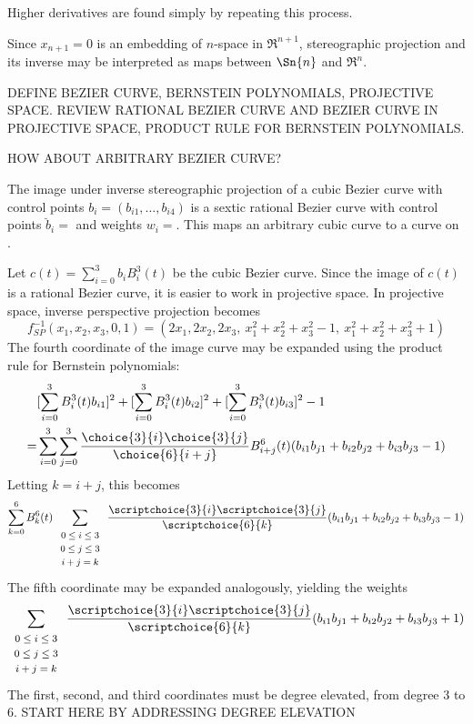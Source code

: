 \documentclass[12pt]{article}
\begin{document}
Higher derivatives are found simply by repeating this process.

Since $x_{n+1}=0$ is an embedding of $n$-space in $\Re^{n+1}$,
stereographic projection and its inverse may be interpreted as maps between 
$\Sn{n}$ and $\Re^n$.

DEFINE BEZIER CURVE, BERNSTEIN POLYNOMIALS, PROJECTIVE SPACE.
REVIEW RATIONAL BEZIER CURVE AND BEZIER CURVE IN PROJECTIVE SPACE,
PRODUCT RULE FOR BERNSTEIN POLYNOMIALS.

HOW ABOUT ARBITRARY BEZIER CURVE?

\begin{theorem}
\label{thm:imagecurve}
The image under inverse stereographic projection 
of a cubic Bezier curve with control points $b_i = (b_{i1},\ldots,b_{i4})$
is a sextic rational Bezier curve 
with control points $\breve{b}_i = $ 
and weights $w_i = $.
This maps an arbitrary cubic curve to a curve on .
\end{theorem}
\prf
Let $c(t) = \sum_{i=0}^3 b_i B_i^3(t)$ be the cubic Bezier curve.
Since the image of $c(t)$ is a rational Bezier curve,
it is easier to work in projective space.
In projective space, inverse perspective projection becomes
\[
f^{-1}_{SP}(x_1,x_2,x_3,0,1) = (2x_1, 2x_2, 2x_3,\ x_1^2 + x_2^2 + x_3^2 - 1, 
                                \ x_1^2 + x_2^2 + x_3^2 + 1)
\]
The fourth coordinate of the image curve may be expanded using the product rule
for Bernstein polynomials:
\begin{eqnarray*}
& [\sum_{i=0}^3 B_i^3(t) b_{i1}]^2 + 
[\sum_{i=0}^3 B_i^3(t) b_{i2}]^2 + 
[\sum_{i=0}^3 B_i^3(t) b_{i3}]^2 - 1 \\
= & \sum_{i=0}^3 \sum_{j=0}^3 
	\frac{\choice{3}{i} \choice{3}{j}}{\choice{6}{i+j}}
       B^6_{i+j}(t) (b_{i1} b_{j1} + b_{i2} b_{j2} + b_{i3} b_{j3} - 1) 
\end{eqnarray*}
Letting $k=i+j$, this becomes
\[ \sum_{k=0}^6 B_k^6(t) 
	\sum_{\begin{array}{c}  \mbox{\footnotesize{$0 \leq i \leq 3$}} \\ 
	                        \mbox{\footnotesize{$0 \leq j \leq 3$}} \\ 
			        \mbox{\footnotesize{$i+j=k$}}
			     \end{array}} 
	\frac{\scriptchoice{3}{i} \scriptchoice{3}{j}}{\scriptchoice{6}{k}}
	(b_{i1} b_{j1} + b_{i2} b_{j2} + b_{i3} b_{j3} - 1) 
\]
The fifth coordinate may be expanded analogously, yielding the weights
\[
	\sum_{\begin{array}{c}  \mbox{\footnotesize{$0 \leq i \leq 3$}} \\ 
	                        \mbox{\footnotesize{$0 \leq j \leq 3$}} \\ 
			        \mbox{\footnotesize{$i+j=k$}}
			     \end{array}} 
	\frac{\scriptchoice{3}{i} \scriptchoice{3}{j}}{\scriptchoice{6}{k}}
	(b_{i1} b_{j1} + b_{i2} b_{j2} + b_{i3} b_{j3} + 1) 
\]
The first, second, and third coordinates must be degree elevated,
from degree 3 to 6.
START HERE BY ADDRESSING DEGREE ELEVATION
\QED
\end{document}
